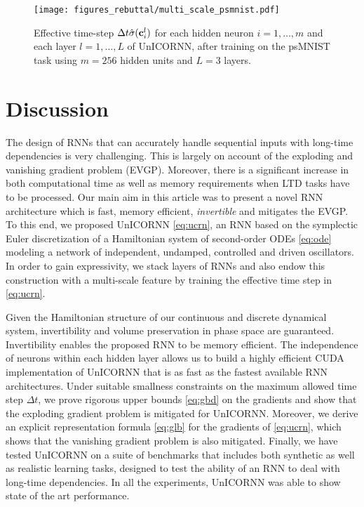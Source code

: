 \documentclass{article}
\newcommand{\bc}{{\bf c}}
\newcommand{\Dt}{{\Delta t}}
\begin{document}
\begin{figure}[ht]
\vskip 0.2in
\begin{center}
\centerline{\texttt{[image: figures\_rebuttal/multi\_scale\_psmnist.pdf]}}
\caption{Effective time-step $\Dt\hat{\sigma}(\bc_i^l)$ for each hidden neuron $i=1,\dots,m$ and each layer $l=1,\dots,L$ of UnICORNN, after training on the psMNIST task using $m=256$ hidden units and $L=3$ layers.}
\label{fig:multi_scale_psmnist}
\end{center}
\vskip -0.2in
\end{figure}

\section{Discussion}
The design of RNNs that can accurately handle sequential inputs with long-time dependencies is very challenging. This is largely on account of the exploding and vanishing gradient problem (EVGP). Moreover, there is a significant increase in both computational time as well as memory requirements when LTD tasks have to be processed. Our main aim in this article was to present a novel RNN architecture which is fast, memory efficient, \emph{invertible} and mitigates the EVGP. To this end, we proposed UnICORNN \eqref{eq:ucrn}, an RNN based on the symplectic Euler discretization of a Hamiltonian system of second-order ODEs \eqref{eq:ode} modeling a network of independent, undamped, controlled and driven oscillators. In order to gain expressivity, we stack layers of RNNs and also endow this construction with a multi-scale feature by training the effective time step in \eqref{eq:ucrn}. 

Given the Hamiltonian structure of our continuous and discrete dynamical system, invertibility and volume preservation in phase space are guaranteed. Invertibility enables the proposed RNN to be memory efficient. The independence of neurons within each hidden layer allows us to build a highly efficient CUDA implementation of UnICORNN that is as fast as the fastest available RNN architectures. Under suitable smallness constraints on the maximum allowed time step $\Dt$, we prove rigorous upper bounds \eqref{eq:gbd} on the gradients and show that the exploding gradient problem is mitigated for UnICORNN. Moreover, we derive an explicit representation formula \eqref{eq:glb} for the gradients of \eqref{eq:ucrn}, which shows that the vanishing gradient problem is also mitigated. Finally, we have tested UnICORNN on a suite of benchmarks that includes both synthetic as well as realistic learning tasks, designed to test the ability of an RNN to deal with long-time dependencies. In all the experiments, UnICORNN was able to show state of the art performance. 
\end{document}

